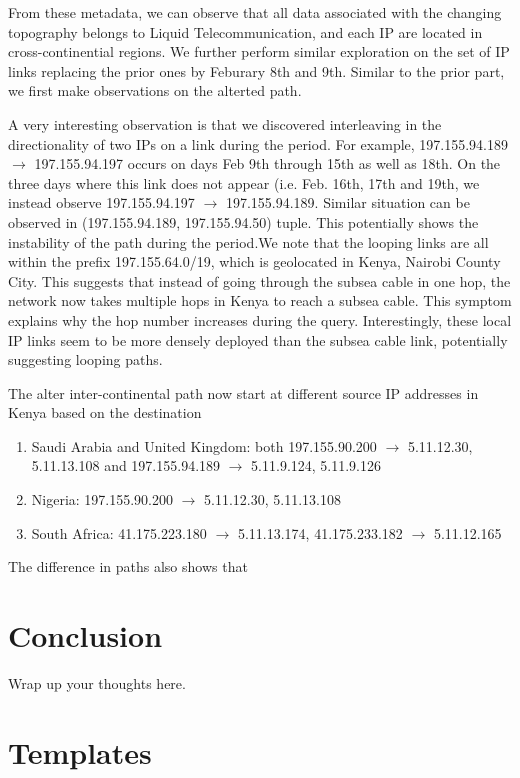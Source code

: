 \documentclass[twocolumn]{article}
\begin{document}
From these metadata, we can observe that all data associated with the changing topography belongs to Liquid Telecommunication, and each IP are located in cross-continential regions. We further perform similar exploration on the set of IP links replacing the prior ones by Feburary 8th and 9th. Similar to the prior part, we first make observations on the alterted path. 

A very interesting observation is that we discovered interleaving in the directionality of two IPs on a link during the period. For example, 197.155.94.189 $\rightarrow$ 197.155.94.197 occurs on days Feb 9th through 15th as well as 18th. On the three days where this link does not appear (i.e. Feb. 16th, 17th and 19th, we instead observe 197.155.94.197 $\rightarrow$ 197.155.94.189. Similar situation can be observed in (197.155.94.189, 197.155.94.50) tuple. This potentially shows the instability of the path during the period.We note that the looping links are all within the prefix 197.155.64.0/19, which is geolocated in Kenya, Nairobi County City. This suggests that instead of going through the subsea cable in one hop, the network now takes multiple hops in Kenya to reach a subsea cable. This symptom explains why the hop number increases during the query. Interestingly, these local IP links seem to be more densely deployed than the subsea cable link, potentially suggesting looping paths.

The alter inter-continental path now start at different source IP addresses in Kenya based on the destination

\begin{enumerate}
    \item Saudi Arabia and United Kingdom: both 197.155.90.200 $\rightarrow$ 5.11.12.30, 5.11.13.108 and 197.155.94.189 $\rightarrow$ 5.11.9.124, 5.11.9.126
    \item Nigeria: 197.155.90.200 $\rightarrow$ 5.11.12.30, 5.11.13.108
    \item South Africa: 41.175.223.180 $\rightarrow$ 5.11.13.174, 41.175.233.182 $\rightarrow$ 5.11.12.165 
\end{enumerate}

The difference in paths also shows that 


\section{Conclusion}
Wrap up your thoughts here.

\section{Templates}
\end{document}
